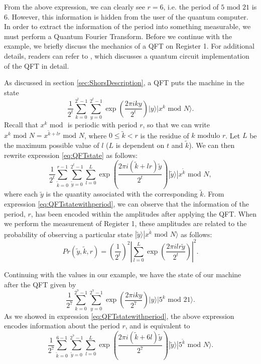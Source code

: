 \documentclass{article}
\begin{document}
From the above expression, we can clearly see $r=6$, i.e. the period of $5 \text{ mod } 21$ is 6. However, this information is hidden from the user of the quantum computer. In order to extract the information of the period into something measurable, we must perform a Quantum Fourier Transform. Before we continue with the example, we briefly discuss the mechanics of a QFT on Register 1. For additional details, readers can refer to \cite{Dra00}, which discusses a quantum circuit implementation of the QFT in detail.

As discussed in section \ref{sec:ShorsDescription}, a QFT puts the machine in the state	
\begin{equation}
\label{eq:QFTstate}
\dfrac{1}{2^t}\sum_{k=0}^{2^t-1}\sum_{y=0}^{2^t-1}\exp\left( \dfrac{2\pi i ky}{2^t} \right)|y\rangle |x^k \text{ mod } N\rangle. 
\end{equation}
Recall that $x^k \text{ mod }$ is periodic with period $r$, so that we can write $x^k \text{ mod } N = x^{\widetilde{k} + lr} \text{ mod } N$, where $0\leq \widetilde{k} < r$ is the residue of $k \text{ modulo } r$. Let $L$ be the maximum possible value of $l$ ($L$ is dependent on $t$ and $\widetilde{k}$). We can then rewrite expression \eqref{eq:QFTstate} as follows: 
\begin{equation}
\label{eq:QFTstatewithperiod}
\dfrac{1}{2^t}\sum_{\widetilde{k} = 0}^{r-1}\sum_{\widetilde{y} = 0}^{2^t-1}\sum_{l=0}^{L} \exp\left(\dfrac{2\pi i (\widetilde{k}+lr)\widetilde{y}}{2^t}\right)|\widetilde{y}\rangle|x^{\widetilde{k}} \text{ mod } N,
\end{equation}
where each $\widetilde{y}$ is the quantity associated with the corresponding $\widetilde{k}$. From expression \eqref{eq:QFTstatewithperiod}, we can observe that the information of the period, $r$, has been encoded within the amplitudes after applying the QFT. When we perform the measurement of Register 1, these amplitudes are related to the probability of observing a particular state $|\widetilde{y}\rangle|x^{\widetilde{k}} \text{ mod }N\rangle$ as follows:
\begin{equation}
\label{eq:prob}
Pr(\widetilde{y},\widetilde{k}, r) = \left(\dfrac{1}{2^t}\right)^2\left|\sum_{l=0}^{L} \exp\left(\dfrac{2\pi i l r \widetilde{y}}{2^t}\right)  \right|^2.
\end{equation}

Continuing with the values in our example, we have the state of our machine after the QFT given by
\begin{equation*}
\dfrac{1}{2^7}\sum_{k=0}^{2^7-1}\sum_{y=0}^{2^7-1}\exp\left( \dfrac{2\pi i ky}{2^7} \right)|y\rangle |5^k \text{ mod } 21\rangle. 
\end{equation*}
As we showed in expression \eqref{eq:QFTstatewithperiod}, the above expression encodes information about the period $r$, and is equivalent to 
\begin{equation*}
\dfrac{1}{2^7}\sum_{\widetilde{k} = 0}^{6-1}\sum_{\widetilde{y} = 0}^{2^7-1}\sum_{l=0}^{L} \exp\left(\dfrac{2\pi i (\widetilde{k}+6l)\widetilde{y}}{2^7}\right)|\widetilde{y}\rangle|5^{\widetilde{k}} \text{ mod } N \rangle.
\end{equation*}
\end{document}

